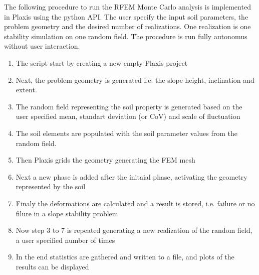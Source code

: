 The following procedure to run the RFEM Monte Carlo analysis is implemented in Plaxis using the python API.
The user specify the input soil parameters, the problem geometry and the desired number of realizations. One realization is one stability simulation on one random field. The procedure is run fully autonomus without user interaction.

\begin{enumerate}
	\item{The script start by creating a new empty Plaxis project}
	\item{Next, the problem geometry is generated i.e. the slope height, inclination and extent.}
	\item{The random field representing the soil property is generated based on the user specified mean, standart deviation (or CoV) and scale of fluctuation}
		
	\item{The soil elements are populated with the soil parameter values from the random field.}
	\item{Then Plaxis grids the geometry generating the FEM mesh}
	\item{Next a new phase is added after the initaial phase, activating the geometry represented by the soil}
	\item{Finaly the deformations are calculated and a result is stored, i.e. failure or no filure in a slope stability problem}
	\item{Now step 3 to 7 is repeated generating a new realization of the random field, a user specified number of times}
	\item{In the end statistics are gathered and written to a file, and plots of the results can be displayed}

\end{enumerate}


